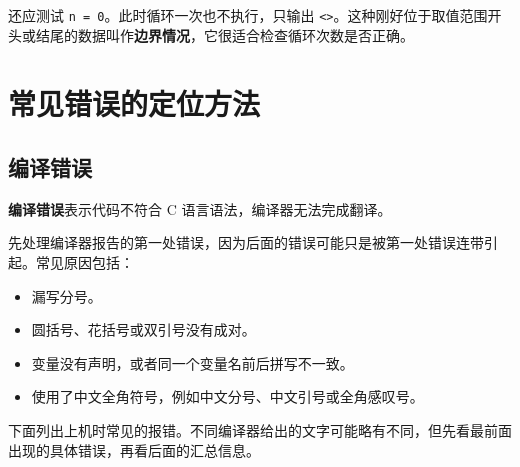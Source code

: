 \documentclass[UTF8,zihao=-4,fontset=windows]{ctexart}
\newcommand{\term}[1]{\textbf{\color{navy}#1}}
\begin{document}
还应测试 \verb|n = 0|。此时循环一次也不执行，只输出 \verb|<>|。这种刚好位于取值范围开头或结尾的数据叫作\term{边界情况}，它很适合检查循环次数是否正确。

\section{常见错误的定位方法}

\subsection{编译错误}

\term{编译错误}表示代码不符合 C 语言语法，编译器无法完成翻译。

先处理编译器报告的第一处错误，因为后面的错误可能只是被第一处错误连带引起。常见原因包括：
\begin{itemize}
  \item 漏写分号。
  \item 圆括号、花括号或双引号没有成对。
  \item 变量没有声明，或者同一个变量名前后拼写不一致。
  \item 使用了中文全角符号，例如中文分号、中文引号或全角感叹号。
\end{itemize}

下面列出上机时常见的报错。不同编译器给出的文字可能略有不同，但先看最前面出现的具体错误，再看后面的汇总信息。
\end{document}
